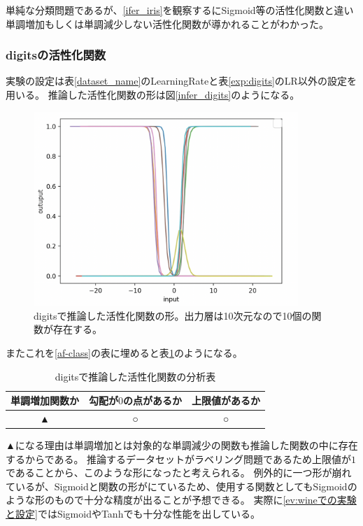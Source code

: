 単純な分類問題であるが、\ref{ifer_iris}を観察するにSigmoid等の活性化関数と違い単調増加もしくは単調減少しない活性化関数が導かれることがわかった。




\subsubsection{digitsの活性化関数}
実験の設定は表\ref{dataset_name}のLearningRateと表\ref{exp:digits}のLR以外の設定を用いる。
推論した活性化関数の形は図\ref{infer_digits}のようになる。
\begin{figure}[hbtp]
    \begin{center}
        \includegraphics[width=10cm]{asset/digits-0.1.png}
            \caption{digitsで推論した活性化関数の形。出力層は10次元なので10個の関数が存在する。}
            \label{ifer_digits}
    \end{center}
\end{figure}

またこれを\ref{af-class}の表に埋めると表\ref{anal_digits}のようになる。
\begin{table}[htbp]
    \begin{center}
        \caption{digitsで推論した活性化関数の分析表}
        \label{anal_digits}
        \vspace{2mm} 
        \begin{tabular}{ |c|c|c| }
        単調増加関数か & 勾配が$ 0 $の点があるか & 上限値があるか   \\
        \hline
        ▲ & ○ & ○   \\
        \end{tabular}
    \end{center}
\end{table}

▲になる理由は単調増加とは対象的な単調減少の関数も推論した関数の中に存在するからである。
推論するデータセットがラベリング問題であるため上限値が$ 1 $であることから、このような形になったと考えられる。
例外的に一つ形が崩れているが、Sigmoidと関数の形がにているため、使用する関数としてもSigmoidのような形のもので十分な精度が出ることが予想できる。
実際に\ref{ev:wineでの実験と設定}ではSigmoidやTanhでも十分な性能を出している。



